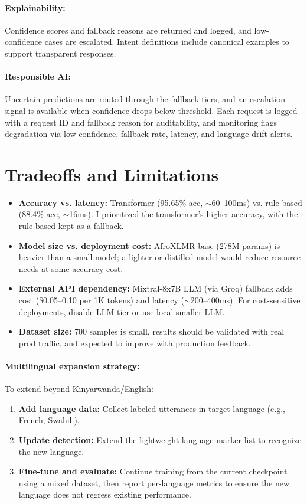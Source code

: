 \documentclass[11pt]{article}
\begin{document}
\paragraph{Explainability:} Confidence scores and fallback reasons are returned and logged, and low-confidence cases are escalated. Intent definitions include canonical examples to support transparent responses.

\paragraph{Responsible AI:} Uncertain predictions are routed through the fallback tiers, and an escalation signal is available when confidence drops below threshold. Each request is logged with a request ID and fallback reason for auditability, and monitoring flags degradation via low-confidence, fallback-rate, latency, and language-drift alerts.

\section*{Tradeoffs and Limitations}

\begin{itemize}
  \item \textbf{Accuracy vs. latency:} Transformer (95.65\% acc, $\sim$60--100ms) vs. rule-based (88.4\% acc, $\sim$16ms). I prioritized the transformer’s higher accuracy, with the rule-based kept as a fallback.
  \item \textbf{Model size vs. deployment cost:} AfroXLMR-base (278M params) is heavier than a small model; a lighter or distilled model would reduce resource needs at some accuracy cost.
  \item \textbf{External API dependency:} Mixtral-8x7B LLM (via Groq) fallback adds cost (\$0.05--0.10 per 1K tokens) and latency ($\sim$200--400ms). For cost-sensitive deployments, disable LLM tier or use local smaller LLM.
  \item \textbf{Dataset size:} 700 samples is small, results should be validated with real prod traffic, and expected to improve with production feedback.
\end{itemize}

\paragraph{Multilingual expansion strategy:}
To extend beyond Kinyarwanda/English:
\begin{enumerate}
  \item \textbf{Add language data:} Collect labeled utterances in target language (e.g., French, Swahili).
  \item \textbf{Update detection:} Extend the lightweight language marker list to recognize the new language.
  \item \textbf{Fine-tune and evaluate:} Continue training from the current checkpoint using a mixed dataset, then report per-language metrics to ensure the new language does not regress existing performance.
\end{enumerate}
\end{document}

